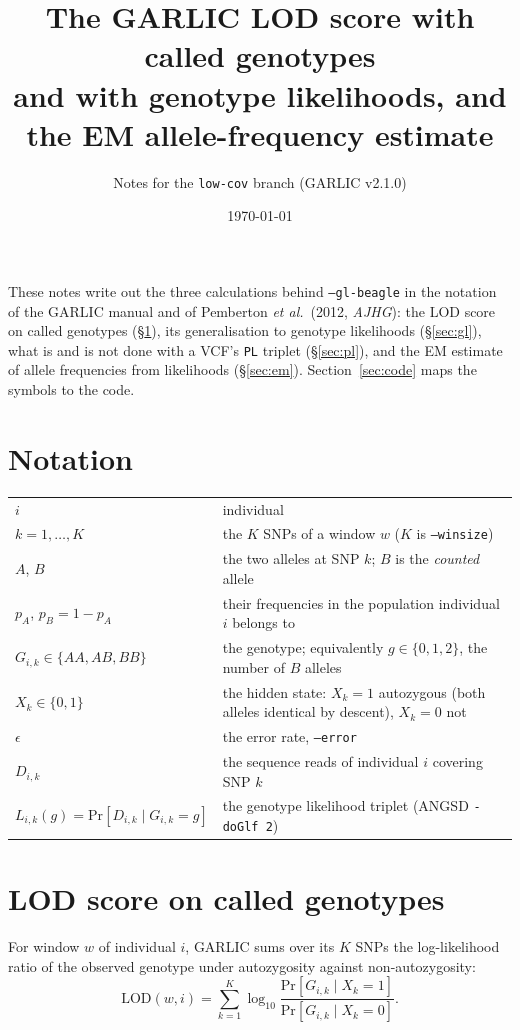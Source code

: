 \documentclass[11pt]{article}
\title{The GARLIC LOD score with called genotypes\\ and with genotype likelihoods, and the EM allele-frequency estimate}
\author{Notes for the \texttt{low-cov} branch (GARLIC v2.1.0)}
\date{\today}
\renewcommand{\Pr}[1]{\mathrm{Pr}\!\left[#1\right]}
\newcommand{\LOD}{\mathrm{LOD}}
\newcommand{\code}[1]{\texttt{#1}}
\begin{document}
\maketitle

\noindent These notes write out the three calculations behind \code{--gl-beagle} in the notation of the GARLIC manual and of Pemberton \emph{et al.}\ (2012, \emph{AJHG}): the LOD score on called genotypes (\S\ref{sec:hard}), its generalisation to genotype likelihoods (\S\ref{sec:gl}), what is and is not done with a VCF's \code{PL} triplet (\S\ref{sec:pl}), and the EM estimate of allele frequencies from likelihoods (\S\ref{sec:em}). Section~\ref{sec:code} maps the symbols to the code.

\section*{Notation}

\begin{tabular}{@{}l>{\raggedright\arraybackslash}p{}@{}}
$i$ & individual \\
$k = 1,\dots,K$ & the $K$ SNPs of a window $w$ ($K$ is \code{--winsize}) \\
$A$, $B$ & the two alleles at SNP $k$; $B$ is the \emph{counted} allele \\
$p_A$, $p_B = 1 - p_A$ & their frequencies in the population individual $i$ belongs to \\
$G_{i,k} \in \{AA, AB, BB\}$ & the genotype; equivalently $g \in \{0,1,2\}$, the number of $B$ alleles \\
$X_k \in \{0,1\}$ & the hidden state: $X_k = 1$ autozygous (both alleles identical by descent), $X_k = 0$ not \\
$\epsilon$ & the error rate, \code{--error} \\
$D_{i,k}$ & the sequence reads of individual $i$ covering SNP $k$ \\
$L_{i,k}(g) = \Pr{D_{i,k} \mid G_{i,k} = g}$ & the genotype likelihood triplet (ANGSD \code{-doGlf 2}) \\
\end{tabular}

\section{LOD score on called genotypes}
\label{sec:hard}

For window $w$ of individual $i$, GARLIC sums over its $K$ SNPs the log-likelihood ratio of the observed genotype under autozygosity against non-autozygosity:
\begin{equation}
\LOD(w,i) = \sum_{k=1}^{K} \log_{10} \frac{\Pr{G_{i,k} \mid X_k = 1}}{\Pr{G_{i,k} \mid X_k = 0}} .
\label{eq:lod}
\end{equation}
\end{document}
